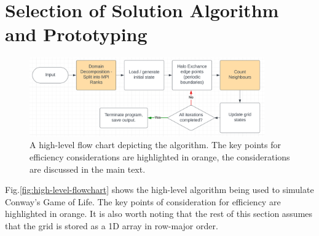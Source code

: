 
\section{Selection of Solution Algorithm and Prototyping}\label{sec:prototyping}
    \begin{figure}[htb]
    \centering
    \includegraphics[width=0.9\textwidth]{./figures/high-level-flowchart}
    \caption{A high-level flow chart depicting the algorithm. The key points for efficiency considerations
    are highlighted in orange, the considerations are discussed in the main text.}
    \label{fig:high-level-flowchart}
    \end{figure}

    Fig.\eqref{fig:high-level-flowchart} shows the high-level algorithm being used to simulate Conway's
    Game of Life.
    The key points of consideration for efficiency are highlighted in orange.
    It is also worth noting that the rest of this section assumes that the grid is stored as a 1D array in row-major order.

